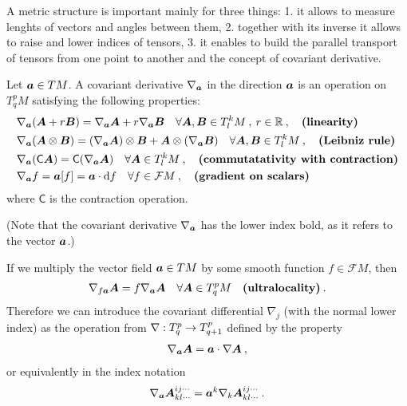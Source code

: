 A metric structure is important mainly for three things: 1. it allows to measure lenghts of vectors and angles between them, 2. together with its inverse it allows to raise and lower indices of tensors, 3. it enables to build the parallel transport of tensors from one point to another and the concept of covariant derivative.

\begin{definition}
    Let $\boldsymbol{a} \in TM$. A covariant derivative $\nabla_{\boldsymbol{a}}$ in the direction $\boldsymbol{a}$ is an operation on $T^p_q M$ satisfying the following properties:
    \begin{align}
        &\nabla_{\boldsymbol{a}} (\boldsymbol{A} + r \boldsymbol{B}) = \nabla_{\boldsymbol{a}} \boldsymbol{A} + r \nabla_{\boldsymbol{a}} \boldsymbol{B} \quad \forall \boldsymbol{A},\boldsymbol{B} \in T^k_l M \:,\: r \in \mathbb{R} \:, \quad \textbf{(linearity)} \\
        &\nabla_{\boldsymbol{a}} (\boldsymbol{A} \otimes \boldsymbol{B}) = (\nabla_{\boldsymbol{a}} \boldsymbol{A}) \otimes \boldsymbol{B} + \boldsymbol{A} \otimes (\nabla_{\boldsymbol{a}} \boldsymbol{B}) \quad \forall \boldsymbol{A},\boldsymbol{B} \in T^k_l M \:, \quad \textbf{(Leibniz rule)} \\
        &\nabla_{\boldsymbol{a}} (\mathsf{C} \boldsymbol{A}) = \mathsf{C} (\nabla_{\boldsymbol{a}} \boldsymbol{A}) \quad \forall \boldsymbol{A} \in T^k_l M \:, \quad \textbf{(commutatativity with contraction)} \\
        &\nabla_{\boldsymbol{a}} f = \boldsymbol{a}[f] = \boldsymbol{a} \cdot \mathrm{d} f \quad \forall f \in \mathcal F M \:, \quad \textbf{(gradient on scalars)}
    \end{align}
    where $\mathsf{C}$ is the contraction operation.
\end{definition}
(Note that the covariant derivative $\nabla_{\boldsymbol{a}}$ has the lower index bold, as it refers to the vector $\boldsymbol{a}$.)

If we multiply the vector field $\boldsymbol{a} \in T M$ by some smooth function $f \in \mathcal F M$, then
\begin{align}
    \nabla_{f \boldsymbol{a}} \boldsymbol{A} = f \nabla_{\boldsymbol{a}} \boldsymbol{A} \quad \forall \boldsymbol{A} \in T^p_q M \quad \textbf{(ultralocality)}\:.
\end{align}
Therefore we can introduce the covariant differential $\nabla_j$ (with the normal lower index) as the operation from $\nabla : T^p_q \to T^p_{q+1}$ defined by the property
\begin{align}
    \nabla_{\boldsymbol{a}} \boldsymbol{A} = \boldsymbol{a} \cdot \nabla \boldsymbol{A} \:,
\end{align} 
or equivalently in the index notation
\begin{align}
    \nabla_{\boldsymbol{a}} \boldsymbol{A}^{ij\cdots}_{kl\cdots} = \boldsymbol{a}^k \nabla_k \boldsymbol{A}^{ij\cdots}_{kl\cdots} \:.
\end{align}


